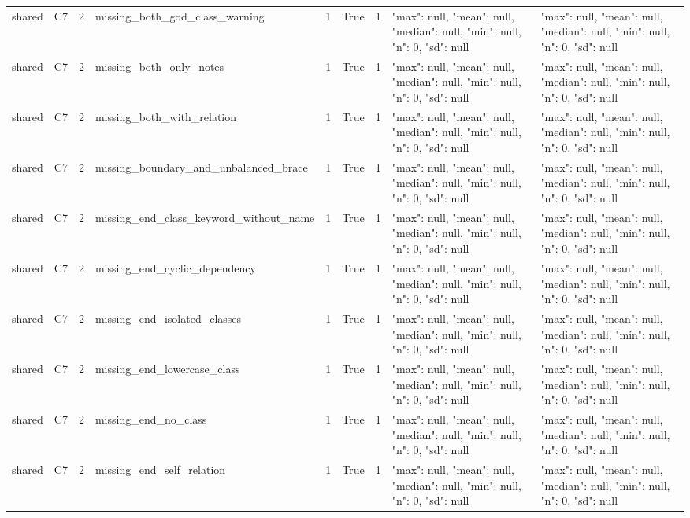 \begin{tabular}{lllllllll}
shared & C7 & 2 & missing\_both\_god\_class\_warning & 1 & True & 1 & {"max": null, "mean": null, "median": null, "min": null, "n": 0, "sd": null} & {"max": null, "mean": null, "median": null, "min": null, "n": 0, "sd": null} \\
shared & C7 & 2 & missing\_both\_only\_notes & 1 & True & 1 & {"max": null, "mean": null, "median": null, "min": null, "n": 0, "sd": null} & {"max": null, "mean": null, "median": null, "min": null, "n": 0, "sd": null} \\
shared & C7 & 2 & missing\_both\_with\_relation & 1 & True & 1 & {"max": null, "mean": null, "median": null, "min": null, "n": 0, "sd": null} & {"max": null, "mean": null, "median": null, "min": null, "n": 0, "sd": null} \\
shared & C7 & 2 & missing\_boundary\_and\_unbalanced\_brace & 1 & True & 1 & {"max": null, "mean": null, "median": null, "min": null, "n": 0, "sd": null} & {"max": null, "mean": null, "median": null, "min": null, "n": 0, "sd": null} \\
shared & C7 & 2 & missing\_end\_class\_keyword\_without\_name & 1 & True & 1 & {"max": null, "mean": null, "median": null, "min": null, "n": 0, "sd": null} & {"max": null, "mean": null, "median": null, "min": null, "n": 0, "sd": null} \\
shared & C7 & 2 & missing\_end\_cyclic\_dependency & 1 & True & 1 & {"max": null, "mean": null, "median": null, "min": null, "n": 0, "sd": null} & {"max": null, "mean": null, "median": null, "min": null, "n": 0, "sd": null} \\
shared & C7 & 2 & missing\_end\_isolated\_classes & 1 & True & 1 & {"max": null, "mean": null, "median": null, "min": null, "n": 0, "sd": null} & {"max": null, "mean": null, "median": null, "min": null, "n": 0, "sd": null} \\
shared & C7 & 2 & missing\_end\_lowercase\_class & 1 & True & 1 & {"max": null, "mean": null, "median": null, "min": null, "n": 0, "sd": null} & {"max": null, "mean": null, "median": null, "min": null, "n": 0, "sd": null} \\
shared & C7 & 2 & missing\_end\_no\_class & 1 & True & 1 & {"max": null, "mean": null, "median": null, "min": null, "n": 0, "sd": null} & {"max": null, "mean": null, "median": null, "min": null, "n": 0, "sd": null} \\
shared & C7 & 2 & missing\_end\_self\_relation & 1 & True & 1 & {"max": null, "mean": null, "median": null, "min": null, "n": 0, "sd": null} & {"max": null, "mean": null, "median": null, "min": null, "n": 0, "sd": null} \\

\end{tabular}
